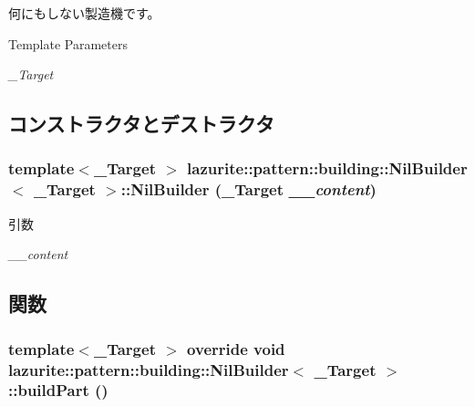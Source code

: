 何にもしない製造機です。 
\begin{DoxyTemplParams}{Template Parameters}
\item[{\em \_\-Target}]\end{DoxyTemplParams}


\subsection{コンストラクタとデストラクタ}
\hypertarget{classlazurite_1_1pattern_1_1building_1_1_nil_builder_3_01___target_01_4_a8005b4e5b30ae89db167f639e52cc075}{
\subsubsection[{NilBuilder}]{\setlength{\rightskip}{0pt plus 5cm}template$<$\_\-Target $>$ lazurite::pattern::building::NilBuilder$<$ \_\-Target $>$::NilBuilder (\_\-Target {\em \_\-\_\-content})}}
\label{classlazurite_1_1pattern_1_1building_1_1_nil_builder_3_01___target_01_4_a8005b4e5b30ae89db167f639e52cc075}

\begin{DoxyParams}{引数}
\item[{\em \_\-\_\-content}]\end{DoxyParams}


\subsection{関数}
\hypertarget{classlazurite_1_1pattern_1_1building_1_1_nil_builder_3_01___target_01_4_a569c538e03c084f2ccd3678ca368383a}{
\subsubsection[{buildPart}]{\setlength{\rightskip}{0pt plus 5cm}template$<$\_\-Target $>$ override void lazurite::pattern::building::NilBuilder$<$ \_\-Target $>$::buildPart ()}}
\label{classlazurite_1_1pattern_1_1building_1_1_nil_builder_3_01___target_01_4_a569c538e03c084f2ccd3678ca368383a}


